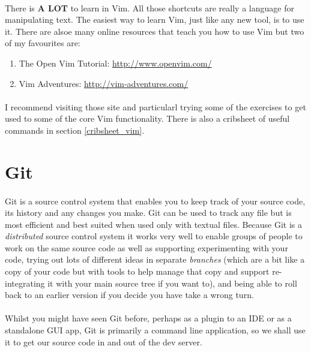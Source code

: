 \documentclass[12pt, a4paper, oneside]{book}
\begin{document}
\paragraph{} There is \textbf{A LOT} to learn in Vim. All those shortcuts are really a language for manipulating text. The easiest way to learn Vim, just like any new tool, is to use it. There are alsoe many online resources that teach you how to use Vim but two of my favourites are:
\begin{enumerate}
\item The Open Vim Tutorial: \url{http://www.openvim.com/}
\item Vim Adventures: \url{http://vim-adventures.com/}
\end{enumerate}

\paragraph{} I recommend visiting those site and particularl trying some of the exercises to get used to some of the core Vim functionality. There is also a cribsheet of useful commands in section \ref{cribsheet_vim}.

\section{Git}
\label{git}
\paragraph{} Git is a source control system that enables you to keep track of your source code, its history and any changes you make. Git can be used to track any file but is most efficient and best suited when used only with textual files. Because Git is a \emph{distributed} source control system it works very well to enable groups of people to work on the same source code as well as supporting experimenting with your code, trying out lots of different ideas in separate \emph{branches} (which are a bit like a copy of your code but with tools to help manage that copy and support re-integrating it with your main source tree if you want to), and being able to roll back to an earlier version if you decide you have take a wrong turn.

\paragraph{} Whilst you might have seen Git before, perhaps as a plugin to an IDE or as a standalone GUI app, Git is primarily a command line application, so we shall use it to get our source code in and out of the dev server.
\end{document}
